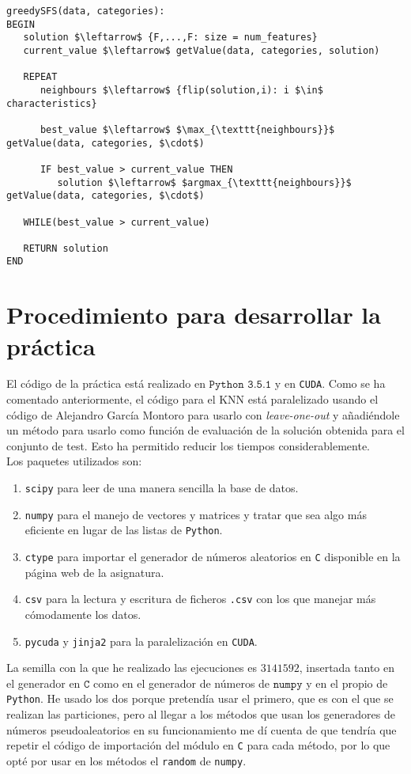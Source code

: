 \documentclass[11pt,leqno]{article}
\begin{document}
	\begin{lstlisting}[mathescape=true]
greedySFS(data, categories):
BEGIN
   solution $\leftarrow$ {F,...,F: size = num_features}
   current_value $\leftarrow$ getValue(data, categories, solution)
   
   REPEAT
      neighbours $\leftarrow$ {flip(solution,i): i $\in$ characteristics}
   
      best_value $\leftarrow$ $\max_{\texttt{neighbours}}$ getValue(data, categories, $\cdot$)
      
      IF best_value > current_value THEN
         solution $\leftarrow$ $argmax_{\texttt{neighbours}}$ getValue(data, categories, $\cdot$)
   
   WHILE(best_value > current_value)
   
   RETURN solution
END
	\end{lstlisting}


\section{Procedimiento para desarrollar la práctica}

El código de la práctica está realizado en $\texttt{Python 3.5.1}$ y en \texttt{CUDA}. Como se ha comentado anteriormente, el código para el KNN está paralelizado usando el código de Alejandro García Montoro para usarlo con \textit{leave-one-out} y añadiéndole un método para usarlo como función de evaluación de la solución obtenida para el conjunto de test. Esto ha permitido reducir los tiempos considerablemente.\\
Los paquetes utilizados son:
\begin{enumerate}
	\item \texttt{scipy} para leer de una manera sencilla la base de datos.
	\item \texttt{numpy} para el manejo de vectores y matrices y tratar que sea algo más eficiente en lugar de las listas de \texttt{Python}.
	\item \texttt{ctype} para importar el generador de números aleatorios en \texttt{C} disponible en la página web de la asignatura. 
	\item \texttt{csv} para la lectura y escritura de ficheros \texttt{.csv} con los que manejar más cómodamente los datos.
	\item \texttt{pycuda} y \texttt{jinja2} para la paralelización en \texttt{CUDA}.
\end{enumerate}	

	La semilla con la que he realizado las ejecuciones es $3141592$, insertada tanto en el generador en $\texttt{C}$ como en el generador de números de $\texttt{numpy}$ y en el propio de \texttt{Python}. He usado los dos porque pretendía usar el primero, que es con el que se realizan las particiones, pero al llegar a los métodos que usan los generadores de números pseudoaleatorios en su funcionamiento me dí cuenta de que tendría que repetir el código de importación del módulo en \texttt{C} para cada método, por lo que opté por usar en los métodos el \texttt{random} de \texttt{numpy}. 
	
\end{document}
